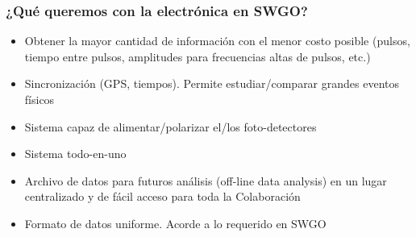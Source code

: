 \documentclass{beamer}
\begin{document}
\begin{frame}
				\frametitle{¿Qué queremos con la electrónica en SWGO?}
				\begin{block}{}
								\begin{itemize}
												\item Obtener la mayor cantidad de información 
													con el menor costo posible (pulsos, tiempo entre pulsos,
													amplitudes para frecuencias altas de pulsos, etc.) 
													\pause
												\item Sincronización (GPS, tiempos). Permite
													estudiar/comparar grandes eventos físicos
													\pause
												\item Sistema capaz de alimentar/polarizar el/los
													foto-detectores
													\pause
												\item Sistema todo-en-uno
													\pause
												\item Archivo de datos para futuros análisis (off-line
													data analysis) en un lugar centralizado y de fácil
													acceso para toda la Colaboración
													\pause
												\item \alert{Formato de datos uniforme. Acorde a lo
													requerido en SWGO}
													\pause

								\end{itemize}
				\end{block}
\end{frame} 

\end{document}
